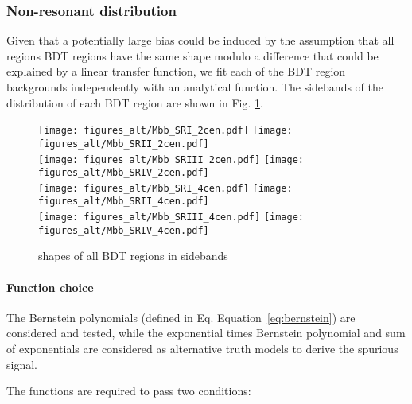 \subsubsection{Non-resonant \Mbb{} distribution}
\label{sec:nonres_alt}

Given that a potentially large bias could be induced by the assumption that all regions BDT regions 
have the same shape modulo a difference that could be explained by a linear transfer function, we fit each 
of the BDT region backgrounds independently with an analytical function. The sidebands of the \Mbb{} 
distribution of each BDT region are shown in Fig. \ref{fig:mbb_sidebands}.

\begin{figure}[htbp]
  \centering
 \texttt{[image: figures\_alt/Mbb\_SRI\_2cen.pdf]}
 \texttt{[image: figures\_alt/Mbb\_SRII\_2cen.pdf]}\\
 \texttt{[image: figures\_alt/Mbb\_SRIII\_2cen.pdf]}
 \texttt{[image: figures\_alt/Mbb\_SRIV\_2cen.pdf]}\\
 \texttt{[image: figures\_alt/Mbb\_SRI\_4cen.pdf]}
 \texttt{[image: figures\_alt/Mbb\_SRII\_4cen.pdf]}\\
 \texttt{[image: figures\_alt/Mbb\_SRIII\_4cen.pdf]}
 \texttt{[image: figures\_alt/Mbb\_SRIV\_4cen.pdf]}\\
\caption{\Mbb{} shapes of all BDT regions in sidebands} 
  \label{fig:mbb_sidebands}
\end{figure}


\paragraph{Function choice}

The Bernstein polynomials (defined in Eq. Equation~\ref{eq:bernstein}) are considered and tested, while the exponential times Bernstein polynomial and  sum of exponentials are considered as alternative truth models to derive the spurious signal. 

The functions are required to pass two conditions:

